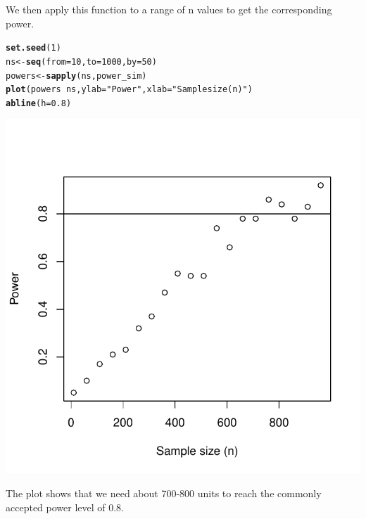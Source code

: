 \documentclass{article}\usepackage[]{graphicx}\usepackage[]{color}
\makeatletter
\def\maxwidth{ %
  \ifdim\Gin@nat@width>\linewidth
    \linewidth
  \else
    \Gin@nat@width
  \fi
}
\newcommand{\hlnum}[1]{\textcolor[rgb]{0.686,0.059,0.569}{#1}}%
\newcommand{\hlstr}[1]{\textcolor[rgb]{0.192,0.494,0.8}{#1}}%
\newcommand{\hlopt}[1]{\textcolor[rgb]{0,0,0}{#1}}%
\newcommand{\hlstd}[1]{\textcolor[rgb]{0.345,0.345,0.345}{#1}}%
\newcommand{\hlkwb}[1]{\textcolor[rgb]{0.69,0.353,0.396}{#1}}%
\newcommand{\hlkwc}[1]{\textcolor[rgb]{0.333,0.667,0.333}{#1}}%
\newcommand{\hlkwd}[1]{\textcolor[rgb]{0.737,0.353,0.396}{\textbf{#1}}}%
\newenvironment{kframe}{%
 \def\at@end@of@kframe{}%
 \ifinner\ifhmode%
  \def\at@end@of@kframe{\end{minipage}}%
  \begin{minipage}{\columnwidth}%
 \fi\fi%
 \def\FrameCommand##1{\hskip\@totalleftmargin \hskip-\fboxsep
 \colorbox{shadecolor}{##1}\hskip-\fboxsep
     \hskip-\linewidth \hskip-\@totalleftmargin \hskip\columnwidth}%
 \MakeFramed {\advance\hsize-\width
   \@totalleftmargin\z@ \linewidth\hsize
   \@setminipage}}%
 {\par\unskip\endMakeFramed%
 \at@end@of@kframe}
\newenvironment{knitrout}{}{} %
\makeatother
\begin{document}
We then apply this function to a range of n values to get the corresponding power.
\begin{knitrout}
\color{fgcolor}\begin{kframe}
\begin{alltt}
\hlkwd{set.seed}\hlstd{(}\hlnum{1}\hlstd{)}
\hlstd{ns} \hlkwb{<-} \hlkwd{seq}\hlstd{(}\hlkwc{from} \hlstd{=} \hlnum{10}\hlstd{,} \hlkwc{to} \hlstd{=} \hlnum{1000}\hlstd{,} \hlkwc{by} \hlstd{=} \hlnum{50}\hlstd{)}
\hlstd{powers} \hlkwb{<-} \hlkwd{sapply}\hlstd{(ns, power_sim)}
\hlkwd{plot}\hlstd{(powers} \hlopt{~} \hlstd{ns,} \hlkwc{ylab} \hlstd{=} \hlstr{"Power"}\hlstd{,} \hlkwc{xlab} \hlstd{=} \hlstr{"Sample size (n)"}\hlstd{)}
\hlkwd{abline}\hlstd{(}\hlkwc{h} \hlstd{=} \hlnum{0.8}\hlstd{)}
\end{alltt}
\end{kframe}
\includegraphics[width=\maxwidth]{figure/unnamed-chunk-7-1} 

\end{knitrout}

The plot shows that we need about 700-800 units to reach the commonly accepted power level of 0.8.
\end{document}
